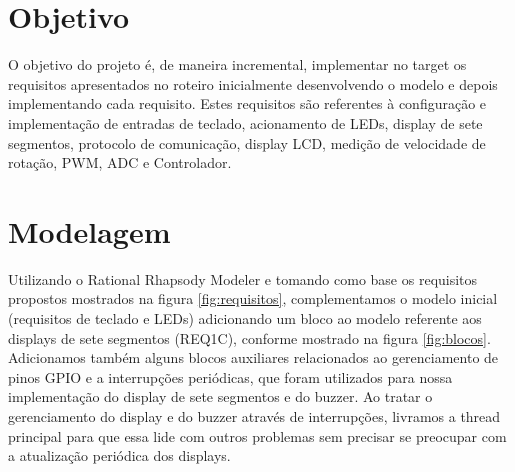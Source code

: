 \documentclass{article}
\begin{document}


\onehalfspacing
\section{Objetivo} 
O objetivo do projeto é, de maneira incremental, implementar no target os requisitos apresentados no roteiro\cite{bb:roteiro} inicialmente desenvolvendo o modelo e depois implementando cada requisito. Estes requisitos são referentes à configuração e implementação de entradas de teclado, acionamento de LEDs, display de sete segmentos, protocolo de comunicação, display LCD, medição de velocidade de rotação, PWM, ADC e Controlador. 
	
\section{Modelagem}
Utilizando o Rational Rhapsody Modeler e tomando como base os requisitos propostos mostrados na figura \ref{fig:requisitos}, complementamos o modelo inicial\cite{bb:modelo} (requisitos de teclado e LEDs) adicionando um bloco ao modelo referente aos displays de sete segmentos (REQ1C), conforme mostrado na figura \ref{fig:blocos}. Adicionamos também alguns blocos auxiliares relacionados ao gerenciamento de pinos GPIO e a interrupções periódicas, que foram utilizados para nossa implementação do display de sete segmentos e do buzzer. Ao tratar o gerenciamento do display e do buzzer através de interrupções, livramos a thread principal para que essa lide com outros problemas sem precisar se preocupar com a atualização periódica dos displays.
\end{document}
